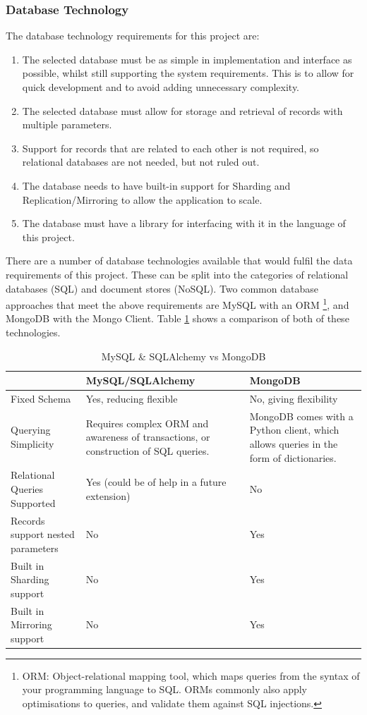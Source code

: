 \documentclass[authoryearcitations]{UoYCSproject}
\begin{document}
\subsubsection{Database Technology}
The database technology requirements for this project are:

\begin{enumerate}
  \item The selected database must be as simple in implementation and interface as possible, whilst still supporting the system requirements.  This is to allow for quick development and to avoid adding unnecessary complexity.
  \item The selected database must allow for storage and retrieval of records with multiple parameters.
  \item Support for records that are related to each other is not required, so relational databases are not needed, but not ruled out.
  \item The database needs to have built-in support for Sharding and Replication/Mirroring to allow the application to scale.
  \item The database must have a library for interfacing with it in the language of this project.
\end{enumerate}

There are a number of database technologies available that would fulfil the data requirements of this project.  These can be split into the categories of relational databases (SQL) and document stores (NoSQL).  Two common database approaches that meet the above requirements are MySQL with an ORM \footnote{ORM: Object-relational mapping tool, which maps queries from the syntax of your programming language to SQL.  ORMs commonly also apply optimisations to queries, and validate them against SQL injections.}, and MongoDB with the Mongo Client.  Table \ref{table:mysqlVsMongo} shows a comparison of both of these technologies.

\begin{table}
\begin{center}
    \begin{tabular}{| p{3.8cm} | p{4.0cm} | p{4.6cm} |}
    \hline
     & MySQL/SQLAlchemy & MongoDB \\ \hline
    Fixed Schema & Yes, reducing flexible & No, giving flexibility \\ \hline
    Querying Simplicity & Requires complex ORM and awareness of transactions, or construction of SQL queries. & MongoDB comes with a Python client, which allows queries in the form of dictionaries. \\ \hline
    Relational Queries Supported & Yes (could be of help in a future extension) & No \\ \hline
    Records support nested parameters & No & Yes \\ \hline
    Built in Sharding support & No & Yes \\ \hline
    Built in Mirroring support & No & Yes \\ \hline
    \end{tabular}
    \caption{MySQL \& SQLAlchemy vs MongoDB}
    \label{table:mysqlVsMongo}
\end{center}
\end{table}
\end{document}
